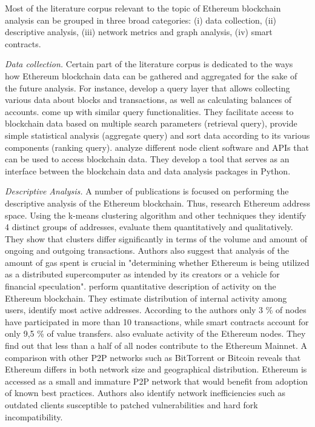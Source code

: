 Most of the literature corpus relevant to the topic of Ethereum blockchain analysis can be grouped in three broad categories: (i) data collection, (ii) descriptive analysis, (iii) network metrics and graph analysis, (iv) smart contracts.

\textit{Data collection.} Certain part of the literature corpus is dedicated to the ways how Ethereum blockchain data can be gathered and aggregated for the sake of the future analysis. For instance, 
\cite{li2017etherql} develop a query layer that allows collecting various data about blocks and transactions, as well as calculating balances of accounts.
\cite{pratama2018query} come up with similar query functionalities.
They facilitate access to blockchain data based on multiple search parameters (retrieval query), provide simple statistical analysis (aggregate query) and sort data according to its various components (ranking query).
\cite{perezanalysis} analyze different node client software and APIs that can be used to access blockchain data.
They develop a tool that serves as an interface between the blockchain data and data analysis packages in Python.



\textit{Descriptive Analysis.} A number of publications is focused on performing the descriptive analysis of the Ethereum blockchain.
Thus, \cite{payette2017characterizing} research Ethereum address space. 
Using the k-means clustering algorithm and other techniques they identify 4 distinct groups of addresses, evaluate them quantitatively and qualitatively.
They show that clusters differ significantly in terms of the volume and amount of ongoing and outgoing transactions.
Authors also suggest that analysis of the amount of gas spent is crucial in "determining whether Ethereum is being utilized as a distributed supercomputer as intended by its creators or a vehicle for financial speculation".
\cite{anoaica2018quantitative} perform quantitative description of activity on the Ethereum blockchain. 
They 
estimate distribution of internal activity among users, identify most active addresses.
According to the authors only 3 \% of nodes have participated in more than 10 transactions, while smart contracts account for only 9,5 \% of value transfers.
\cite{kim2018measuring} also evaluate activity of the Ethereum nodes. 
They find out that less than a half of all nodes contribute to the Ethereum Mainnet. 
A comparison with other P2P networks such as BitTorrent or Bitcoin reveals that Ethereum differs in both network size and
geographical distribution. 
Ethereum is accessed as a small and immature P2P network that would benefit from adoption of known best practices.
Authors also identify network inefficiencies such as outdated clients susceptible to patched vulnerabilities and hard fork incompatibility.

